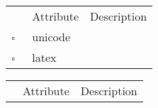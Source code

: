 \clearpage
\begin{table}
\caption{Translator  }

\begin{longtable}{llp{8cm}}
& Attribute & Description \\
$\square$\ & unicode &  \\
$\square$\ & latex &  \\
\end{longtable}
\label{attr:Translator}
\end{table}

\begin{table}
\caption{UncategorizedReference  }

\begin{longtable}{llp{8cm}}
& Attribute & Description \\
\end{longtable}
\label{attr:UncategorizedReference}
\end{table}

